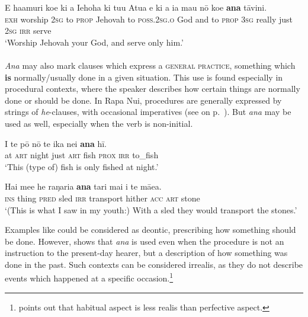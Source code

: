 \ea\label{ex:11.176}
\gll E ha{\ꞌ}amuri koe ki a Iehoha ki tu{\ꞌ}u {\ꞌ}Atua  {\ꞌ}e ki a ia mau nō koe \textbf{ana} tāvini.\\
\textsc{exh} worship \textsc{2sg} to \textsc{prop} Jehovah to \textsc{poss.2sg.o} God  and to \textsc{prop} \textsc{3sg} really just \textsc{2sg} \textsc{irr} serve\\

\glt 
‘Worship Jehovah your God, and serve only him.’ \textstyleExampleref{[Mat. 4:10]}
\z

\paragraph{} \textit{Ana} may also mark clauses which express a \textsc{general practice}, something which \textbf{is} normally/usually done in a given situation. This use is found especially in procedural contexts, where the speaker describes how certain things are normally done or should be done. In Rapa Nui, procedures are generally expressed by strings of \textit{he}{}-clauses, with occasional imperatives (see  on p.~\pageref{ex:7.5}). But \textit{ana} may be used as well, especially when the verb is non-initial. 

\ea\label{ex:11.177}
\gll {\ꞌ}I te pō nō te ika nei \textbf{ana} hī. \\
at \textsc{art} night just \textsc{art} fish \textsc{prox} \textsc{irr} to\_fish \\

\glt 
‘This (type of) fish is only fished at night.’ \textstyleExampleref{[R364.007]} 
\z

\ea\label{ex:11.178}
\gll Hai me{\ꞌ}e he raŋaria \textbf{ana} tari mai i te mā{\ꞌ}ea. \\
\textsc{ins} thing \textsc{pred} sled \textsc{irr} transport hither \textsc{acc} \textsc{art} stone \\

\glt
‘(This is what I saw in my youth:) With a sled they would transport the stones.’ \textstyleExampleref{[R107.044]} 
\z

Examples like  could be considered as deontic, prescribing how something should be done. However,  shows that \textit{ana} is used even when the procedure is not an instruction to the present-day hearer, but a description of how something was done in the past. Such contexts can be considered irrealis, as they do not describe events which happened at a specific occasion.\footnote{\label{fn:523}\citet[245]{Payne1997} points out that habitual aspect is less realis than perfective aspect.} 

